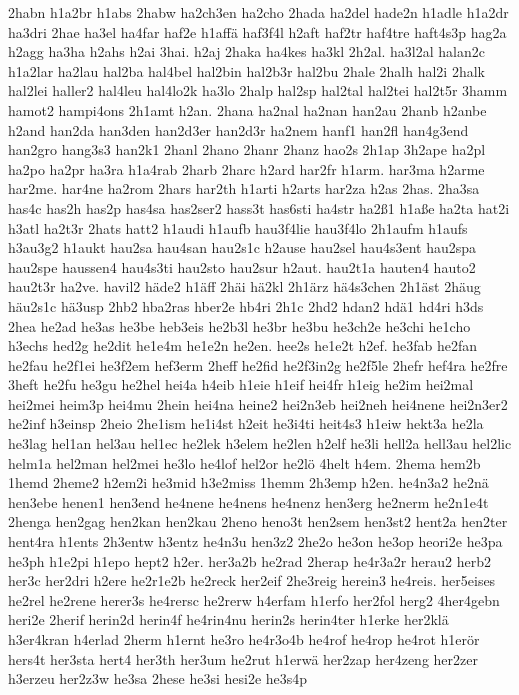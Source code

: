 {2habn
h1a2br
h1abs
2habw
ha2ch3en
ha2cho
2hada
ha2del
hade2n
h1adle
h1a2dr
ha3dri
2hae
ha3el
ha4far
haf2e
h1affä
haf3f4l
h2aft
haf2tr
haf4tre
haft4s3p
hag2a
h2agg
ha3ha
h2ahs
h2ai
3hai.
h2aj
2haka
ha4kes
ha3kl
2h2al.
ha3l2al
halan2c
h1a2lar
ha2lau
hal2ba
hal4bel
hal2bin
hal2b3r
hal2bu
2hale
2halh
hal2i
2halk
hal2lei
haller2
hal4leu
hal4lo2k
ha3lo
2halp
hal2sp
hal2tal
hal2tei
hal2t5r
3hamm
hamot2
hampi4ons
2h1amt
h2an.
2hana
ha2nal
ha2nan
han2au
2hanb
h2anbe
h2and
han2da
han3den
han2d3er
han2d3r
ha2nem
hanf1
han2fl
han4g3end
han2gro
hang3s3
han2k1
2hanl
2hano
2hanr
2hanz
hao2s
2h1ap
3h2ape
ha2pl
ha2po
ha2pr
ha3ra
h1a4rab
2harb
2harc
h2ard
har2fr
h1arm.
har3ma
h2arme
har2me.
har4ne
ha2rom
2hars
har2th
h1arti
h2arts
har2za
h2as
2has.
2ha3sa
has4c
has2h
has2p
has4sa
has2ser2
hass3t
has6sti
ha4str
ha2ß1
h1aße
ha2ta
hat2i
h3atl
ha2t3r
2hats
hatt2
h1audi
h1aufb
hau3f4lie
hau3f4lo
2h1aufm
h1aufs
h3au3g2
h1aukt
hau2sa
hau4san
hau2s1c
h2ause
hau2sel
hau4s3ent
hau2spa
hau2spe
haussen4
hau4s3ti
hau2sto
hau2sur
h2aut.
hau2t1a
hauten4
hauto2
hau2t3r
ha2ve.
havil2
häde2
h1äff
2häi
hä2kl
2h1ärz
hä4s3chen
2h1äst
2häug
häu2s1c
hä3usp
2hb2
hba2ras
hber2e
hb4ri
2h1c
2hd2
hdan2
hdä1
hd4ri
h3ds
2hea
he2ad
he3as
he3be
heb3eis
he2b3l
he3br
he3bu
he3ch2e
he3chi
he1cho
h3echs
hed2g
he2dit
he1e4m
he1e2n
he2en.
hee2s
he1e2t
h2ef.
he3fab
he2fan
he2fau
he2f1ei
he3f2em
hef3erm
2heff
he2fid
he2f3in2g
he2f5le
2hefr
hef4ra
he2fre
3heft
he2fu
he3gu
he2hel
hei4a
h4eib
h1eie
h1eif
hei4fr
h1eig
he2im
hei2mal
hei2mei
heim3p
hei4mu
2hein
hei4na
heine2
hei2n3eb
hei2neh
hei4nene
hei2n3er2
he2inf
h3einsp
2heio
2he1ism
he1i4st
h2eit
he3i4ti
heit4s3
h1eiw
hekt3a
he2la
he3lag
hel1an
hel3au
hel1ec
he2lek
h3elem
he2len
h2elf
he3li
hell2a
hell3au
hel2lic
helm1a
hel2man
hel2mei
he3lo
he4lof
hel2or
he2lö
4helt
h4em.
2hema
hem2b
1hemd
2heme2
h2em2i
he3mid
h3e2miss
1hemm
2h3emp
h2en.
he4n3a2
he2nä
hen3ebe
henen1
hen3end
he4nene
he4nens
he4nenz
hen3erg
he2nerm
he2n1e4t
2henga
hen2gag
hen2kan
hen2kau
2heno
heno3t
hen2sem
hen3st2
hent2a
hen2ter
hent4ra
h1ents
2h3entw
h3entz
he4n3u
hen3z2
2he2o
he3on
he3op
heori2e
he3pa
he3ph
h1e2pi
h1epo
hept2
h2er.
her3a2b
he2rad
2herap
he4r3a2r
herau2
herb2
her3c
her2dri
h2ere
he2r1e2b
he2reck
her2eif
2he3reig
herein3
he4reis.
her5eises
he2rel
he2rene
herer3s
he4rersc
he2rerw
h4erfam
h1erfo
her2fol
herg2
4her4gebn
heri2e
2herif
herin2d
herin4f
he4rin4nu
herin2s
herin4ter
h1erke
her2klä
h3er4kran
h4erlad
2herm
h1ernt
he3ro
he4r3o4b
he4rof
he4rop
he4rot
h1erör
hers4t
her3sta
hert4
her3th
her3um
he2rut
h1erwä
her2zap
her4zeng
her2zer
h3erzeu
her2z3w
he3sa
2hese
he3si
hesi2e
he3s4p
}
